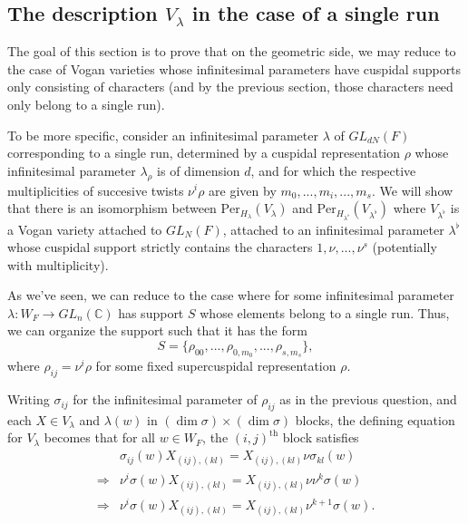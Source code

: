 \documentclass{memoir}
\newcommand{\bc}{\mathbb{C}}
\newcommand{\tx}{\text}
\theoremstyle{definition}
\begin{document}
	
	
	
	
	
	
	
	
	
	
	
	
	
	
	
	
	
	
	
	
	
	
	\subsection{The description $V_\lambda$ in the case of a single run}
	
	The goal of this section is to prove that on the geometric side, we may reduce to the case of Vogan varieties whose infinitesimal parameters have cuspidal supports only consisting of characters (and by the previous section, those characters need only belong to a single run).  
	
	To be more specific, consider an infinitesimal parameter $\lambda$ of $GL_{dN}(F)$ corresponding to a single run, determined by a cuspidal representation $\rho$ whose infinitesimal parameter $\lambda_{\rho}$ is of dimension $d$, and for which the respective multiplicities of succesive twists $\nu^i\rho$ are given by $m_0, ..., m_i, ..., m_s$.  
	We will show that there is an isomorphism between $\tx{Per}_{H_\lambda}(V_\lambda)$ and $\tx{Per}_{H_{\lambda^\flat }}(V_{\lambda^\flat})$ where $V_{\lambda^\flat}$ is a Vogan variety attached to $GL_N(F)$, attached to an infinitesimal parameter $\lambda^\flat$ whose cuspidal support strictly contains the characters $1, \nu, ..., \nu^s$ (potentially with multiplicity).  
	
	
	As we've seen, we can reduce to the case where for some infinitesimal parameter\\
	$\lambda:W_F\to GL_n(\bc)$ has support $S$ whose elements belong to a single run.  
	Thus, we can organize the support such that it has the form
	$$S=\{\rho_{00}, ..., \rho_{0, m_0}, ..., \rho_{s, m_s}\},$$
	where $\rho_{ij}=\nu^i\rho$ for some fixed supercuspidal representation $\rho$.  
	
	Writing $\sigma_{ij}$ for the infinitesimal parameter of $\rho_{ij}$ as in the previous question, and each $X\in V_\lambda$ and $\lambda(w)$ in $(\dim\sigma)\times(\dim\sigma)$ blocks, the defining equation for $V_\lambda$ becomes that for all $w\in W_F$, the $(i,j)^{\tx{th}}$ block satisfies
	\begin{align*}
		&\sigma_{ij}(w)X_{(ij),(kl)}=X_{(ij),(kl)}\nu\sigma_{kl}(w)\\
		\Rightarrow&\nu^i\sigma(w)X_{(ij),(kl)}=X_{(ij),(kl)}\nu\nu^k\sigma(w)\\
		\Rightarrow & \nu^i\sigma(w)X_{(ij),(kl)}=X_{(ij),(kl)}\nu^{k+1}\sigma(w).
	\end{align*}
	
\end{document}
